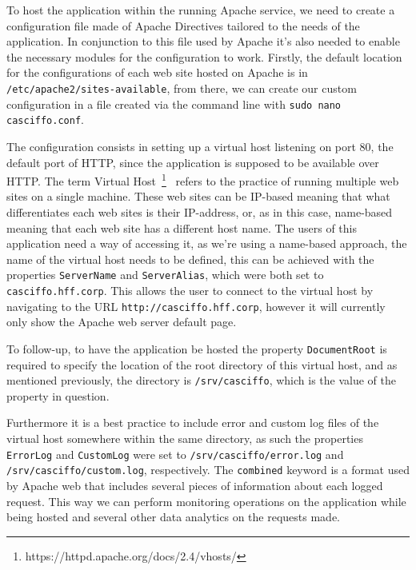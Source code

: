 To host the application within the running Apache service, we need to create a configuration file made of Apache Directives tailored to the needs of the application. In conjunction to this file used by Apache it's also needed to enable the necessary modules for the configuration to work.
Firstly, the default location for the configurations of each web site hosted on Apache is in \lstinline{/etc/apache2/sites-available}, from there, we can create our custom configuration in a file created via the command line with \lstinline{sudo nano casciffo.conf}. 

The configuration consists in setting up a virtual host listening on port 80, the default port of HTTP, since the application is supposed to be available over HTTP. The term Virtual Host~\footnote{https://httpd.apache.org/docs/2.4/vhosts/}~\label{fn:apache-vh} refers to the practice of running multiple web sites on a single machine. These web sites can be IP-based meaning that what differentiates each web sites is their IP-address, or, as in this case, name-based meaning that each web site has a different host name. 
The users of this application need a way of accessing it, as we're using a name-based approach, the name of the virtual host needs to be defined, this can be achieved with the properties \lstinline{ServerName} and \lstinline{ServerAlias}, which were both set to \lstinline{casciffo.hff.corp}. This allows the user to connect to the virtual host by navigating to the URL \lstinline{http://casciffo.hff.corp}, however it will currently only show the Apache web server default page.

To follow-up, to have the application be hosted the property \lstinline{DocumentRoot} is required to specify the location of the root directory of this virtual host, and as mentioned previously, the directory is \lstinline{/srv/casciffo}, which is the value of the property in question. 

Furthermore it is a best practice to include error and custom log files of the virtual host somewhere within the same directory, as such the properties \lstinline{ErrorLog} and \lstinline{CustomLog} were set to \lstinline{/srv/casciffo/error.log} and \lstinline{/srv/casciffo/custom.log}, respectively. The \lstinline{combined} keyword is a format used by Apache web that includes several pieces of information about each logged request.
This way we can perform monitoring operations on the application while being hosted and several other data analytics on the requests made.

